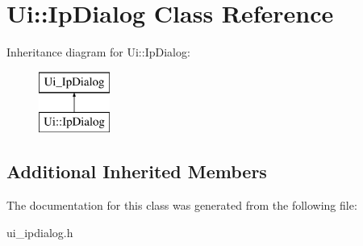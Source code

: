 \hypertarget{class_ui_1_1_ip_dialog}{}\section{Ui\+:\+:Ip\+Dialog Class Reference}
\label{class_ui_1_1_ip_dialog}
Inheritance diagram for Ui\+:\+:Ip\+Dialog\+:\begin{figure}[H]
\begin{center}
\leavevmode
\includegraphics[height=2.000000cm]{class_ui_1_1_ip_dialog}
\end{center}
\end{figure}
\subsection*{Additional Inherited Members}


The documentation for this class was generated from the following file\+:\begin{DoxyCompactItemize}
\item 
ui\+\_\+ipdialog.\+h\end{DoxyCompactItemize}

